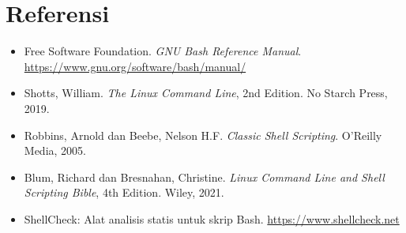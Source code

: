 \section{Referensi}
\label{sec:referensi-bash-programming}

\begin{itemize}
    \item Free Software Foundation. \textit{GNU Bash Reference Manual}.
          \url{https://www.gnu.org/software/bash/manual/}
    \item Shotts, William. \textit{The Linux Command Line}, 2nd Edition.
          No Starch Press, 2019.
    \item Robbins, Arnold dan Beebe, Nelson H.F. \textit{Classic Shell
          Scripting}. O'Reilly Media, 2005.
    \item Blum, Richard dan Bresnahan, Christine. \textit{Linux Command
          Line and Shell Scripting Bible}, 4th Edition. Wiley, 2021.
    \item ShellCheck: Alat analisis statis untuk skrip Bash.
          \url{https://www.shellcheck.net}
\end{itemize}
